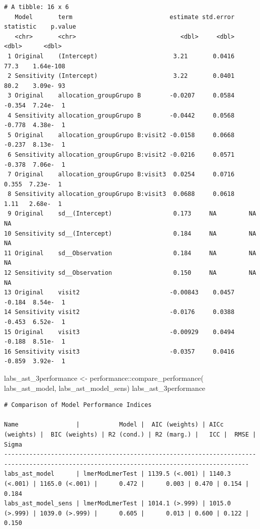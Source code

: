 \documentclass[
  12pt,
]{article}
\newenvironment{Shaded}{\begin{snugshade}}{\end{snugshade}}
\newcommand{\FunctionTok}[1]{\textcolor[rgb]{0.28,0.35,0.67}{#1}}
\newcommand{\NormalTok}[1]{\textcolor[rgb]{0.00,0.23,0.31}{#1}}
\newcommand{\OtherTok}[1]{\textcolor[rgb]{0.00,0.23,0.31}{#1}}
\newcommand{\SpecialCharTok}[1]{\textcolor[rgb]{0.37,0.37,0.37}{#1}}
\begin{document}
\begin{verbatim}
# A tibble: 16 x 6
   Model       term                           estimate std.error statistic    p.value
   <chr>       <chr>                             <dbl>     <dbl>     <dbl>      <dbl>
 1 Original    (Intercept)                     3.21       0.0416    77.3    1.64e-108
 2 Sensitivity (Intercept)                     3.22       0.0401    80.2    3.09e- 93
 3 Original    allocation_groupGrupo B        -0.0207     0.0584    -0.354  7.24e-  1
 4 Sensitivity allocation_groupGrupo B        -0.0442     0.0568    -0.778  4.38e-  1
 5 Original    allocation_groupGrupo B:visit2 -0.0158     0.0668    -0.237  8.13e-  1
 6 Sensitivity allocation_groupGrupo B:visit2 -0.0216     0.0571    -0.378  7.06e-  1
 7 Original    allocation_groupGrupo B:visit3  0.0254     0.0716     0.355  7.23e-  1
 8 Sensitivity allocation_groupGrupo B:visit3  0.0688     0.0618     1.11   2.68e-  1
 9 Original    sd__(Intercept)                 0.173     NA         NA     NA        
10 Sensitivity sd__(Intercept)                 0.184     NA         NA     NA        
11 Original    sd__Observation                 0.184     NA         NA     NA        
12 Sensitivity sd__Observation                 0.150     NA         NA     NA        
13 Original    visit2                         -0.00843    0.0457    -0.184  8.54e-  1
14 Sensitivity visit2                         -0.0176     0.0388    -0.453  6.52e-  1
15 Original    visit3                         -0.00929    0.0494    -0.188  8.51e-  1
16 Sensitivity visit3                         -0.0357     0.0416    -0.859  3.92e-  1
\end{verbatim}

\begin{Shaded}
\begin{Highlighting}[]
\NormalTok{labs\_ast\_3performance }\OtherTok{\textless{}{-}}\NormalTok{ performance}\SpecialCharTok{::}\FunctionTok{compare\_performance}\NormalTok{(}
\NormalTok{    labs\_ast\_model, }
\NormalTok{    labs\_ast\_model\_sens)}
\NormalTok{labs\_ast\_3performance}
\end{Highlighting}
\end{Shaded}

\begin{verbatim}
# Comparison of Model Performance Indices

Name                |           Model |  AIC (weights) | AICc (weights) |  BIC (weights) | R2 (cond.) | R2 (marg.) |   ICC |  RMSE | Sigma
------------------------------------------------------------------------------------------------------------------------------------------
labs_ast_model      | lmerModLmerTest | 1139.5 (<.001) | 1140.3 (<.001) | 1165.0 (<.001) |      0.472 |      0.003 | 0.470 | 0.154 | 0.184
labs_ast_model_sens | lmerModLmerTest | 1014.1 (>.999) | 1015.0 (>.999) | 1039.0 (>.999) |      0.605 |      0.013 | 0.600 | 0.122 | 0.150
\end{verbatim}
\end{document}
